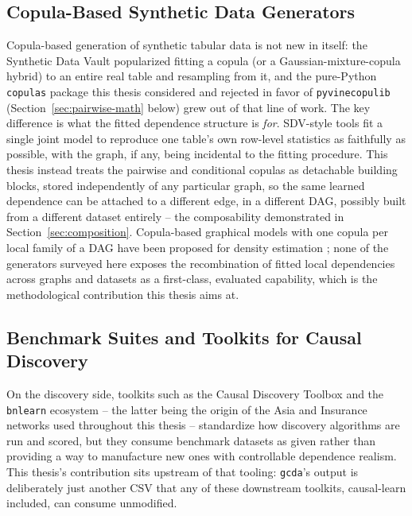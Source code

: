 \documentclass[
  english,
  class=report,
  accentcolor=2c,
  marginpar=false,
  parskip=half-,
  fontsize=11pt,
  ruledheaders=false,
  pdfa=false,
  IMRAD=false,
  thesis={type=master}
]{tudapub}
\begin{document}
\subsection{Copula-Based Synthetic Data Generators}
Copula-based generation of synthetic tabular data is not new in itself: the
Synthetic Data Vault \parencite{patki2016} popularized fitting a copula (or a
Gaussian-mixture-copula hybrid) to an entire real table and resampling from
it, and the pure-Python \texttt{copulas} package this thesis considered and
rejected in favor of \texttt{pyvinecopulib} (Section~\ref{sec:pairwise-math}
below) grew out of that line of work. The key difference is what the fitted
dependence structure is \emph{for}. SDV-style tools fit a single joint model
to reproduce one table's own row-level statistics as faithfully as possible,
with the graph, if any, being incidental to the fitting procedure. This
thesis instead treats the pairwise and conditional copulas as detachable
building blocks, stored independently of any particular graph, so the same
learned dependence can be attached to a different edge, in a different DAG,
possibly built from a different dataset entirely -- the composability
demonstrated in Section~\ref{sec:composition}. Copula-based graphical
models with one copula per local family of a DAG have been proposed for
density estimation \parencite{elidan2010}; none of the generators surveyed
here exposes the recombination of fitted local dependencies across graphs
and datasets as a first-class, evaluated capability, which is the
methodological contribution this thesis aims at.

\subsection{Benchmark Suites and Toolkits for Causal Discovery}
On the discovery side, toolkits such as the Causal Discovery Toolbox
\parencite{kalainathan2020} and the \texttt{bnlearn} ecosystem
\parencite{scutari2010} -- the latter being the origin of the Asia and
Insurance networks used throughout this thesis -- standardize how discovery
algorithms are run and scored, but they consume benchmark datasets as given
rather than providing a way to manufacture new ones with controllable
dependence realism. This thesis's contribution sits upstream of that
tooling: \texttt{gcda}'s output is deliberately just another CSV that any of
these downstream toolkits, causal-learn included, can consume unmodified.
\end{document}

